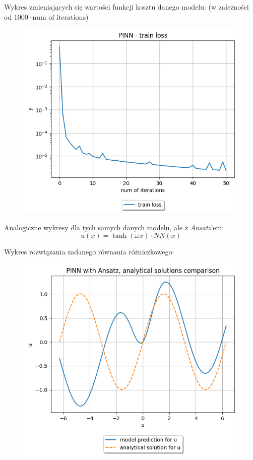 \documentclass{article}
\begin{document}
Wykres zmieniających się wartości funkcji kosztu danego modelu:
(w zależności od $1000 \cdot \text{num of iterations}$)\\

\begin{figure}[H]
  \includegraphics[width=\linewidth]{figures/1_train.png}
\end{figure}

Analogiczne wykresy dla tych samych danych modelu, ale z \textit{Ansatz}'em:
$$u(x) = \tanh(\omega x) \cdot NN(x) $$

Wykres rozwiązania zadanego równania różniczkowego: \\

\begin{figure}[H]
  \includegraphics[width=\linewidth]{figures/1_ans.png}
\end{figure}
\end{document}
